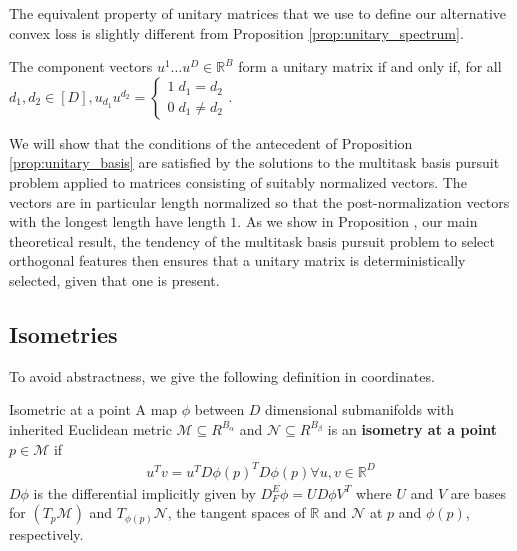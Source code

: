 \documentclass[a4paper,11pt]{article}
\begin{document}
The equivalent property of unitary matrices that we use to define our alternative convex loss is slightly different from Proposition \ref{prop:unitary_spectrum}.
\begin{proposition}
\label{prop:unitary_basis}
The component vectors $u^1 \dots u^D \in \mathbb R^B$ form a unitary matrix if and only if, for all $d_1, d_2 \in [D], u_{d_1} u^{d_2} = \begin{cases}
1 \; d_1 = d_2\\ 
0 \; d_1 \neq d_2 
\end{cases}$.
\end{proposition}

We will show that the conditions of the antecedent of Proposition \ref{prop:unitary_basis} are satisfied by the solutions to the multitask basis pursuit problem applied to matrices consisting of suitably normalized vectors.
The vectors are in particular length normalized so that the post-normalization vectors with the longest length have length $1$.
As we show in Proposition , our main theoretical result,  the tendency of the multitask basis pursuit problem to select orthogonal features then ensures that a unitary matrix is deterministically selected, given that one is present.


\subsection{Isometries}

To avoid abstractness, we give the following definition in coordinates.

\begin{definition}{Isometric at a point}
A map $\phi$ between $D$ dimensional submanifolds with inherited Euclidean metric $\mathcal M \subseteq R^{B_\alpha}$ and $\mathcal N  \subseteq R^{B_\beta}$ is an \textbf{isometry at a point} $p \in \mathcal M$ if
\begin{align}
u^T v = u^T {D \phi (p)}^T D \phi (p) \forall u,v \in \mathbb R^D
\end{align}
$D \phi$ is the differential implicitly given by $D_{F}^E \phi = U D \phi V^T$ where $U$ and $V$ are bases for $(T_p \mathcal M)$ and $T_{\phi(p)} \mathcal N$, the tangent spaces of $\mathbb R$ and $\mathcal N$ at $p$ and $\phi(p)$, respectively.
\end{definition}
\end{document}
